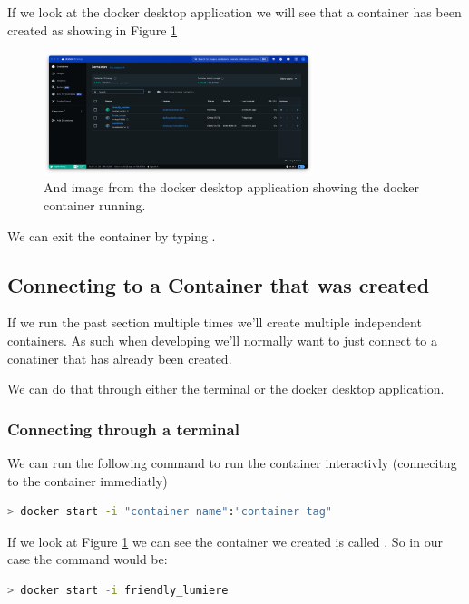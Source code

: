 \documentclass[final]{article}
\numberwithin{equation}{section}
\theoremstyle{remarkStyle}
\begin{document}
If we look at the docker desktop application we will see that a container has been created as showing in Figure \ref{fig:docker_container_created}

\begin{figure}[H]
  \centering
  \includegraphics[width=0.7\textwidth]{DockerContainerRunning.png}
  \caption{And image from the docker desktop application showing the docker container running.}%
  \label{fig:docker_container_created}%
\end{figure}



We can exit the container by typing .

\subsection{Connecting to a Container that was created}

If we run the past section multiple times we'll create multiple independent containers. As such when developing we'll normally want to just connect to a conatiner that has already been created.

We can do that through either the terminal or the docker desktop application.
\subsubsection{Connecting through a terminal}

We can run the following command to run the container interactivly (connecitng to the container immediatly)
\begin{lstlisting}[language=bash]
  > docker start -i "container name":"container tag"
\end{lstlisting}

If we look at Figure \ref{fig:docker_container_created} we can see the container we created is called .
So in our case the command would be:
\begin{lstlisting}[language=bash]
  > docker start -i friendly_lumiere
\end{lstlisting}
\end{document}
